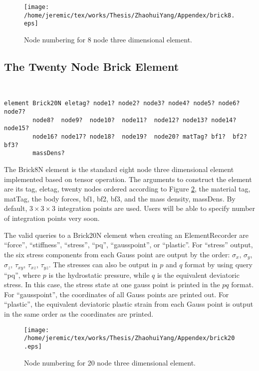 %
\begin{figure}[!htbp]
\begin{center}
\texttt{[image: /home/jeremic/tex/works/Thesis/ZhaohuiYang/Appendex/brick8.eps]}
\caption{\label{8node}
Node numbering for 8 node three dimensional element.}
\end{center}
\end{figure}


\subsection{The Twenty Node Brick Element} \

\begin{verbatim}
element Brick20N eletag? node1? node2? node3? node4? node5? node6? node7?
        node8?  node9?  node10?  node11?  node12? node13? node14? node15? 
        node16? node17? node18?  node19?  node20? matTag? bf1?  bf2? bf3? 
        massDens?
\end{verbatim}
The   Brick8N   element   is  the  standard  eight  node  three
dimensional  element implemented based on tensor operation. The
arguments  to  construct the element are its tag, eletag, twenty
nodes  ordered  according  to  Figure \ref{20node}, the material
tag,  matTag,  the  body  forces,  bf1,  bf2, bf3, and the mass
density, massDens. By default, $3\times 3 \times 3$ integration
points  are  used.  Users  will  be  able  to specify number of
integration points very soon.

The  valid  queries  to  a  Brick20N  element  when creating an
ElementRecorder   are  ``force'',  ``stiffness'',  ``stress'',  ``pq'',
``gausspoint'', or ``plastic''.
%
For  ``stress''  output,  the  six  stress components from each
Gauss  point  are  output by the order: $\sigma_x$, $\sigma_y$,
$\sigma_z$, $\tau_{xy}$, $\tau_{xz}$, $\tau_{yz}$.
%
The  stresses can also be output in $p$ and $q$ format by using
query ``pq'', where $p$ is the hydrostatic pressure, while $q$ is
the  equivalent  deviatoric  stress.  In  this case, the stress
state at one gauss point is printed in the $pq$ format.
%
For  ``gausspoint'',  the  coordinates  of all Gauss points are
printed out. For ``plastic'', the equivalent deviatoric plastic
strain from each Gauss point is output in the same order as the
coordinates are printed.
%
\begin{figure}[!htbp]
\begin{center}
\texttt{[image: /home/jeremic/tex/works/Thesis/ZhaohuiYang/Appendex/brick20.eps]}
\caption{\label{20node} Node numbering for 20 node three dimensional element.}
\end{center}
\end{figure}
%
